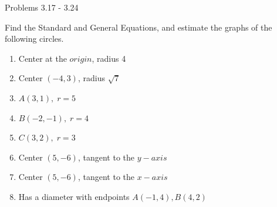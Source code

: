 \documentclass[14pt,aspectratio=169]{beamer}
\begin{document}
\begin{frame}{Problems 3.17 - 3.24}

 \begin{exampleblock}{Find the Standard and General Equations, and estimate the graphs of the following circles.}
  \begin{enumerate}
   \item Center at the $origin$, radius 4
   \item Center $(-4,3)$, radius $\sqrt{7}$
   \item $A(3,1), \; r=5$
   \item $B(-2,-1), \; r=4$
   \item $C(3,2), \; r=3$
   \item Center $(5,-6)$, tangent to the $y-axis$
   \item Center $(5,-6)$, tangent to the $x-axis$
   \item Has a diameter with endpoints $A(-1,4), B(4,2)$

  \end{enumerate}

 \end{exampleblock}

\end{frame}
\end{document}
